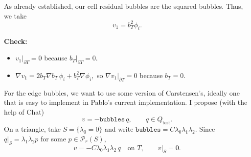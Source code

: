 \documentclass[12pt,a4paper]{article}
\newcommand{\PP}{\mathcal{P}}
\newcommand{\qtest}{Q_{\mathrm{test}}}
\newcommand{\bubbles}{\texttt{bubbles}}
\begin{document}
As already established, our cell residual bubbles are the squared bubbles. Thus, we take
\begin{equation}
    v_1=b_T^2\phi_i.
\end{equation}

\textbf{Check:}
\begin{itemize}
    \item $v_1|_{\partial T}=0$ because $b_T|_{\partial T}=0$.
    \item
        $\nabla v_1=2b_T\nabla b_T\,\phi_i+b_T^2\nabla\phi_i,$
    so $\nabla v_1|_{\partial T}=0$ because $b_T=0$.
\end{itemize}

For the edge bubbles, we want to use some version of Carstensen's, ideally one that is easy to implement in Pablo's current implementation. I propose (with the help of Chat)
\begin{equation}
    v=-\bubbles\,q,\qquad q\in\qtest.
\end{equation}
On a triangle, take $S=\{\lambda_0=0\}$ and write
$\bubbles=C\lambda_0\lambda_1\lambda_2$. Since
$q|_S=\lambda_1\lambda_2 p$ for some $p\in\PP_r(S)$,
\begin{equation}
    v=-C\lambda_0\lambda_1\lambda_2\,q\quad\text{on }T,
    \qquad v|_S=0.
\end{equation}
\end{document}
